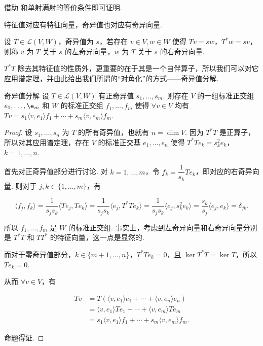 借助 和单射满射的等价条件即可证明.

特征值对应有特征向量，奇异值也对应有奇异向量.

\begin{definition}{}{}
    设 $ T \in \mathcal{L}(V, W) $，奇异值为 $ s $，若存在 $ v \in V, w \in W $ 使得 $ Tv = sw $，$ T^*w = sv $，则称 $ v $ 为 $ T $ 关于 $ s $ 的左奇异向量，$ w $ 为 $ T $ 关于 $ s $ 的右奇异向量.
\end{definition}

$ T^*T $ 除去其特征值的性质外，更重要的在于其是一个自伴算子，所以我们可以对它应用谱定理，并由此给出我们所谓的“对角化”的方式——奇异值分解.

\begin{theorem}{奇异值分解}{} 
    设 $ T \in \mathcal{L}(V, W) $ 有正奇异值 $ s_1, \ldots , s_m $. 则存在 $ V $ 的一组标准正交组 $ e_1, \ldots, \e_m $ 和 $ W $ 的标准正交组 $ f_1, \ldots, f_m $ 使得 $ \forall v \in V $ 均有$ Tv = s_1 \langle v, e_1 \rangle f_1 + \cdots + s_m \langle v, e_m \rangle f_m $.
\end{theorem}

\begin{proof}
    设 $ s_1, \ldots, s_n $ 为 $ T $ 的所有奇异值，也就有 $ n = \dim V $. 因为 $ T^*T $ 是正算子，所以对其应用谱定理，存在 $ V $ 的标准正交基 $ e_1, \ldots, e_n $ 使得 $ T^*Te_k = s_k^2e_k $，$ k = 1, \ldots, n $.

    首先对正奇异值部分进行讨论. 对 $ k = 1, \ldots, m $，令 $ f_k = \dfrac{1}{s_k}Te_k $，即对应的右奇异向量. 则对于 $j, k \in \{1, \ldots, m\}$，有

    \[
        \langle f_j, f_k \rangle = \frac{1}{s_j s_k} \langle Te_j, Te_k \rangle = \frac{1}{s_j s_k} \langle e_j, T^*Te_k \rangle = \frac{1}{s_j s_k} \langle e_j, s_k^2e_k \rangle = \frac{s_k}{s_j} \langle e_j, e_k \rangle = \delta_{jk}.
    \]

    所以 $ f_1, \ldots, f_m $ 是 $ W $ 的标准正交组. 事实上，考虑到左奇异向量和右奇异向量分别是 $ T^*T $ 和 $ TT^* $ 的特征向量，这一点是显然的.

    而对于零奇异值部分，$k \in \{m+1, \ldots, n\}$，$ T^*Te_k = 0 $，且 $ \ker T^*T = \ker T $，所以 $ Te_k = 0 $.

    从而 $ \forall v \in V $，有

    \begin{align*}
        Tv & = T(\langle v, e_1 \rangle e_1 + \cdots + \langle v, e_n \rangle e_n)       \\
           & = \langle v, e_1 \rangle Te_1 + \cdots + \langle v, e_m \rangle Te_m        \\
           & = s_1 \langle v, e_1 \rangle f_1 + \cdots + s_m \langle v, e_m \rangle f_m.
    \end{align*}

    命题得证.
\end{proof}

